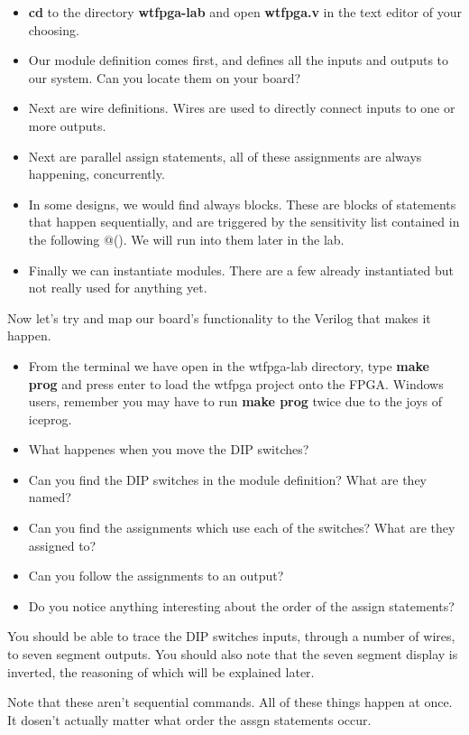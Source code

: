 \documentclass[12pt,a4paper]{article}
\begin{document}
\begin{itemize}
	\item \textbf{cd} to the directory \textbf{wtfpga-lab} and open \textbf{wtfpga.v} in the text editor of your choosing.
	\item Our module definition comes first, and defines all the inputs and outputs to our system. Can you locate them on your board?
	\item Next are wire definitions. Wires are used to	directly connect inputs to one or more outputs.
	\item Next are parallel assign statements, all of these assignments are always happening, concurrently. 
	\item In some designs, we would find always blocks. These are blocks of statements that happen sequentially, and are triggered by the sensitivity list contained in the following @(). We will run into them later in the lab.
	\item Finally we can instantiate modules. There are a few already instantiated but not really used for anything yet.
\end{itemize}
\noindent
Now let’s try and map our board’s functionality to the Verilog that makes it happen.
\begin{itemize}
	\item From the terminal we have open in the wtfpga-lab directory, type \textbf{make prog} and press enter to load the wtfpga project onto the FPGA. Windows users, remember you may have to run \textbf{make prog} twice due to the joys of iceprog. 
	\item What happenes when you move the DIP switches?
	\item Can you find the DIP switches in the module definition? What are they named?
	\item Can you find the assignments which use each of the switches? What are they assigned to?
	\item Can you follow the assignments to an output?
	\item Do you notice anything interesting about the order of the assign statements?
\end{itemize}
\noindent
You should be able to trace the DIP switches inputs, through a number of wires, to seven segment outputs. You should also note that the seven segment display is inverted, the reasoning of which will be explained later. 

Note that these aren't sequential commands. All of these things happen at once. It dosen't actually matter what order the assgn statements occur. 
\newpage
\end{document}
